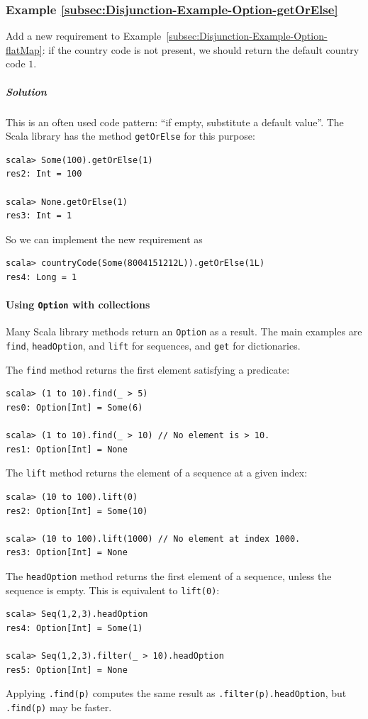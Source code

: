 \subsubsection{Example \label{subsec:Disjunction-Example-Option-getOrElse}\ref{subsec:Disjunction-Example-Option-getOrElse}}

Add a new requirement to Example~\ref{subsec:Disjunction-Example-Option-flatMap}:
if the country code is not present, we should return the default country
code $1$.

\subparagraph{Solution}

This is an often used code pattern: ``if empty, substitute a default
value''. The Scala library has the method \lstinline!getOrElse!
for this purpose:
\begin{lstlisting}
scala> Some(100).getOrElse(1)
res2: Int = 100

scala> None.getOrElse(1)
res3: Int = 1
\end{lstlisting}
So we can implement the new requirement as
\begin{lstlisting}
scala> countryCode(Some(8004151212L)).getOrElse(1L)
res4: Long = 1
\end{lstlisting}


\paragraph{Using \texttt{Option} with collections}

Many Scala library methods return an \lstinline!Option! as a result.
The main examples are \lstinline!find!, \lstinline!headOption!,
and \lstinline!lift! for sequences, and \lstinline!get! for dictionaries.

The \lstinline!find! method returns the first element satisfying
a predicate:
\begin{lstlisting}
scala> (1 to 10).find(_ > 5)
res0: Option[Int] = Some(6)

scala> (1 to 10).find(_ > 10) // No element is > 10.
res1: Option[Int] = None
\end{lstlisting}

The \lstinline!lift! method returns the element of a sequence at
a given index:
\begin{lstlisting}
scala> (10 to 100).lift(0)
res2: Option[Int] = Some(10)

scala> (10 to 100).lift(1000) // No element at index 1000.
res3: Option[Int] = None
\end{lstlisting}

The \lstinline!headOption! method returns the first element of a
sequence, unless the sequence is empty. This is equivalent to \lstinline!lift(0)!:
\begin{lstlisting}
scala> Seq(1,2,3).headOption
res4: Option[Int] = Some(1)

scala> Seq(1,2,3).filter(_ > 10).headOption
res5: Option[Int] = None
\end{lstlisting}
Applying \lstinline!.find(p)! computes the same result as \lstinline!.filter(p).headOption!,
but \lstinline!.find(p)! may be faster.

